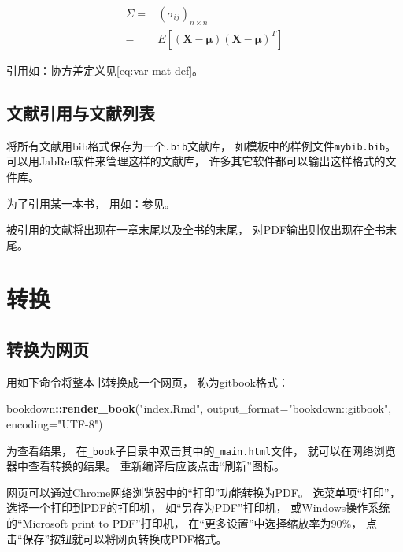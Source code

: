 \documentclass[
]{article}
\newenvironment{Shaded}{\begin{snugshade}}{\end{snugshade}}
\newcommand{\AttributeTok}[1]{\textcolor[rgb]{0.13,0.29,0.53}{#1}}
\newcommand{\FunctionTok}[1]{\textcolor[rgb]{0.13,0.29,0.53}{\textbf{#1}}}
\newcommand{\NormalTok}[1]{#1}
\newcommand{\SpecialCharTok}[1]{\textcolor[rgb]{0.81,0.36,0.00}{\textbf{#1}}}
\newcommand{\StringTok}[1]{\textcolor[rgb]{0.31,0.60,0.02}{#1}}
\begin{document}
\begin{align}
\Sigma =&  (\sigma_{ij})_{n\times n} \nonumber \\
=& E[(\boldsymbol{X} - \boldsymbol{\mu}) (\boldsymbol{X} - \boldsymbol{\mu})^T ] 
\label{eq:var-mat-def}
\end{align}

引用如：协方差定义见\eqref{eq:var-mat-def}。

\subsection{文献引用与文献列表}\label{ux6587ux732eux5f15ux7528ux4e0eux6587ux732eux5217ux8868}

将所有文献用bib格式保存为一个\texttt{.bib}文献库，
如模板中的样例文件\texttt{mybib.bib}。
可以用JabRef软件来管理这样的文献库，
许多其它软件都可以输出这样格式的文件库。

为了引用某一本书，
用如：参见\autocite{Wichmann1982:RNG}。

被引用的文献将出现在一章末尾以及全书的末尾，
对PDF输出则仅出现在全书末尾。

\section{转换}\label{usage-output}

\subsection{转换为网页}\label{usage-gitbook}

用如下命令将整本书转换成一个网页，
称为gitbook格式：

\begin{Shaded}
\begin{Highlighting}[]
\NormalTok{bookdown}\SpecialCharTok{::}\FunctionTok{render\_book}\NormalTok{(}\StringTok{"index.Rmd"}\NormalTok{, }
  \AttributeTok{output\_format=}\StringTok{"bookdown::gitbook"}\NormalTok{, }\AttributeTok{encoding=}\StringTok{"UTF{-}8"}\NormalTok{)}
\end{Highlighting}
\end{Shaded}

为查看结果，
在\texttt{\_book}子目录中双击其中的\texttt{\_main.html}文件，
就可以在网络浏览器中查看转换的结果。
重新编译后应该点击``刷新''图标。

网页可以通过Chrome网络浏览器中的``打印''功能转换为PDF。
选菜单项``打印''，
选择一个打印到PDF的打印机，
如``另存为PDF''打印机，
或Windows操作系统的``Microsoft print to PDF''打印机，
在``更多设置''中选择缩放率为90\%，
点击``保存''按钮就可以将网页转换成PDF格式。
\end{document}
